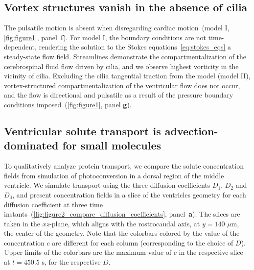 \documentclass[fleqn]{wlscirep}
\begin{document}
\subsection*{Vortex structures vanish in the absence of cilia}
The pulsatile motion is absent when disregarding cardiac motion~(model I, \cref{fig:figure1}, panel~\textbf{f}). For model I, the boundary conditions are not time-dependent, rendering the solution to the Stokes equations~\eqref{eq:stokes_eqs} a steady-state flow field. Streamlines demonstrate the compartmentalization of the cerebrospinal fluid flow driven by cilia, and we observe highest vorticity in the vicinity of cilia. Excluding the cilia tangential traction from the model (model II), vortex-structured compartmentalization of the ventricular flow does not occur, and the flow is directional and pulsatile as a result of the pressure boundary conditions imposed~(\cref{fig:figure1}, panel \textbf{g}). 

\subsection*{Ventricular solute transport is advection-dominated for small molecules}
To qualitatively analyze protein transport, we compare the solute concentration fields from simulation of photoconversion in a dorsal region of the middle ventricle. We simulate transport using the three diffusion coefficients $D_1$, $D_2$ and $D_3$, and present concentration fields in a slice of the ventricles geometry for each diffusion coefficient at three time instants~(\cref{fig:figure2_compare_diffusion_coefficients}, panel~\textbf{a}). The slices are taken in the $xz$-plane, which aligns with the rostrocaudal axis, at $y=140$ $\mu$m, the center of the geometry. Note that the colorbars colored by the value of the concentration $c$ are different for each column (corresponding to the choice of $D$). Upper limits of the colorbars are the maximum value of $c$ in the respective slice at $t=450.5$ s, for the respective $D$. 
\end{document}
